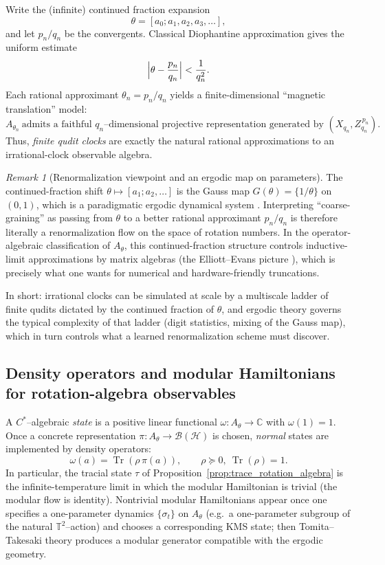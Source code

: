 \documentclass[11pt,oneside]{amsbook}
\numberwithin{equation}{section}
\theoremstyle{plain}
\theoremstyle{definition}
\theoremstyle{remark}
\newtheorem{remark}[theorem]{Remark}
\newcommand{\C}{\mathbb{C}}
\DeclareMathOperator{\Tr}{\mathrm{Tr}}
\newcommand{\cH}{\mathcal{H}}
\begin{document}
Write the (infinite) continued fraction expansion
\[
\theta = [a_0;a_1,a_2,a_3,\dots],
\]
and let $p_n/q_n$ be the convergents.
Classical Diophantine approximation gives the uniform estimate
\[
\Bigl|\theta-\frac{p_n}{q_n}\Bigr| < \frac{1}{q_n^2}.
\]
Each rational approximant $\theta_n=p_n/q_n$ yields a finite-dimensional ``magnetic translation'' model:
\[
A_{\theta_n}\ \text{admits a faithful $q_n$--dimensional projective representation generated by } (X_{q_n},Z_{q_n}^{\,p_n}).
\]
Thus, \emph{finite qudit clocks} are exactly the natural rational approximations to an irrational-clock observable algebra.

\begin{remark}[Renormalization viewpoint and an ergodic map on parameters]
The continued-fraction shift $\theta\mapsto [a_1;a_2,\dots]$ is the Gauss map $G(\theta)=\{1/\theta\}$ on $(0,1)$,
which is a paradigmatic ergodic dynamical system \cite{Walters1982ErgodicTheory}.
Interpreting ``coarse-graining'' as passing from $\theta$ to a better rational approximant $p_n/q_n$ is therefore literally a renormalization flow on the space of rotation numbers.
In the operator-algebraic classification of $A_\theta$, this continued-fraction structure controls inductive-limit approximations by matrix algebras (the Elliott--Evans picture \cite{ElliottEvans1993Rotation}),
which is precisely what one wants for numerical and hardware-friendly truncations.
\end{remark}

In short: irrational clocks can be simulated at scale by a multiscale ladder of finite qudits dictated by the continued fraction of $\theta$,
and ergodic theory governs the typical complexity of that ladder (digit statistics, mixing of the Gauss map), which in turn controls what a learned renormalization scheme must discover.

\subsection{Density operators and modular Hamiltonians for rotation-algebra observables}
A $C^*$--algebraic \emph{state} is a positive linear functional $\omega:A_\theta\to\C$ with $\omega(1)=1$.
Once a concrete representation $\pi:A_\theta\to\mathcal{B}(\cH)$ is chosen, \emph{normal} states are implemented by density operators:
\[
\omega(a)=\Tr(\rho\,\pi(a)),\qquad \rho\succeq 0,\ \Tr(\rho)=1.
\]
In particular, the tracial state $\tau$ of Proposition~\ref{prop:trace_rotation_algebra} is the infinite-temperature limit in which the modular Hamiltonian is trivial (the modular flow is identity).
Nontrivial modular Hamiltonians appear once one specifies a one-parameter dynamics $\{\sigma_t\}$ on $A_\theta$ (e.g.\ a one-parameter subgroup of the natural $\mathbb{T}^2$--action)
and chooses a corresponding KMS state; then Tomita--Takesaki theory produces a modular generator compatible with the ergodic geometry.
\end{document}
